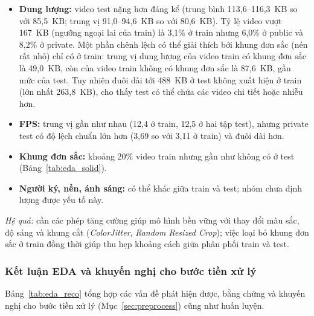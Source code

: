 \begin{itemize}
  \item \textbf{Dung lượng:} video test nặng hơn đáng kể (trung bình 113,6--116,3~KB so với 85,5~KB; trung vị 91,0--94,6~KB so với 80,6~KB). Tỷ lệ video vượt 167~KB (ngưỡng ngoại lai của train) là 3,1\% ở train nhưng 6,0\% ở public và 8,2\% ở private. Một phần chênh lệch có thể giải thích bởi khung đơn sắc (nén rất nhỏ) chỉ có ở train: trung vị dung lượng của video train có khung đơn sắc là 49,0~KB, còn của video train không có khung đơn sắc là 87,6~KB, gần mức của test. Tuy nhiên đuôi dài tới 488~KB ở test không xuất hiện ở train (lớn nhất 263,8~KB), cho thấy test có thể chứa các video chi tiết hoặc nhiễu hơn.
  \item \textbf{FPS:} trung vị gần như nhau (12,4 ở train, 12,5 ở hai tập test), nhưng private test có độ lệch chuẩn lớn hơn (3,69 so với 3,11 ở train) và đuôi dài hơn.
  \item \textbf{Khung đơn sắc:} khoảng 20\% video train nhưng gần như không có ở test (Bảng~\ref{tab:eda_solid}).
  \item \textbf{Người ký, nền, ánh sáng:} có thể khác giữa train và test; nhóm chưa định lượng được yếu tố này.
\end{itemize}

\noindent\textit{Hệ quả:} cần các phép tăng cường giúp mô hình bền vững với thay đổi màu sắc, độ sáng và khung cắt (\textit{ColorJitter}, \textit{Random Resized Crop}); việc loại bỏ khung đơn sắc ở train đồng thời giúp thu hẹp khoảng cách giữa phân phối train và test.

\subsubsection{Kết luận EDA và khuyến nghị cho bước tiền xử lý}
\label{subsec:eda_conclusion}

Bảng~\ref{tab:eda_reco} tổng hợp các vấn đề phát hiện được, bằng chứng và khuyến nghị cho bước tiền xử lý (Mục~\ref{sec:preprocess}) cũng như huấn luyện.


